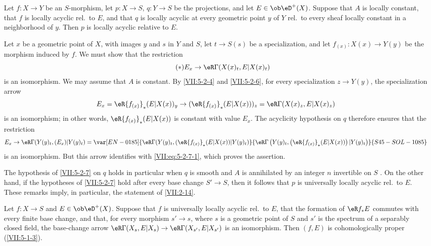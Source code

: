 \begin{corollary}\label{VII:5-2-7}
Let $f:X\to Y$ be an $S$-morphism, let $p:X\to S$, $q:Y\to S$ be the
projections, and let $E\in\ob\eD^+(X)$. Suppose that $A$ is locally constant,
that $f$ is locally acyclic rel.\ to $E$, and that $q$ is locally acyclic at
every geometric point $y$ of $Y$ rel.\ to every sheaf locally constant
in a neighborhood of $y$. Then $p$ is locally acyclic relative to $E$.
\end{corollary}

Let $x$ be a geometric point of $X$, with images $y$ and $s$ in $Y$ and $S$,
let $t\to S(s)$ be a specialization, and let
$f_{(x)}:X(x)\to Y(y)$ be the morphism induced by $f$. We must show that the
restriction
\begin{equation*}\tag{$*$}\label{VII:eq:5-2-7-1}
  E_x \to \eR\Gamma(X(x)_t,E|X(x)_t) 
\end{equation*}
is an isomorphism. We may assume that $A$ is constant. By \ref{VII:5-2-4} and
\ref{VII:5-2-6}, for every specialization $z\to Y(y)$, the specialization
arrow
\[
  E_x = \eR {f_{(x)}}_\ast (E|X(x))_y \to (\eR {f_{(x)}}_\ast (E|X(x)))_z = \eR\Gamma(X(x)_z,E|X(x)_z) 
\]
is an isomorphism; in other words, $\eR{f_{(x)}}_\ast(E|X(x))$ is constant
with value $E_x$. The acyclicity hypothesis on $q$ therefore ensures that the restriction
\[
  E_x \to \eR\Gamma(Y(y)_t,(E_x)|Y(y)_t) = \var[EN-0185]{\eR\Gamma(Y(y)_t,(\eR {f_{(x)}}_\ast (E|X(x))|Y(y)_t)}{\eR\Gamma\left(Y(y)_t,\left(\eR {f_{(x)}}_\ast (E|X(x))\right)|Y(y)_t\right)}{S45-SOL-1085}
\]
is an isomorphism. But this arrow identifies with
\eqref{VII:eq:5-2-7-1}, which proves the assertion.

The hypothesis of \ref{VII:5-2-7} on $q$ holds in particular when $q$ is
smooth and $A$ is annihilated by an integer $n$ invertible on $S$
. On the other hand, if the hypotheses of \ref{VII:5-2-7} hold
after every base change $S'\to S$, then it follows that $p$ is universally
locally acyclic rel.\ to $E$. These remarks imply, in particular, the
statement of \ref{VII:2-14}.






\begin{corollary}\label{VII:5-2-8}
Let $f:X\to S$ and $E\in \ob\eD^+(X)$. Suppose that $f$ is universally locally
acyclic rel.\ to $E$, that the formation of $\eR f_\ast E$ commutes with
every finite base change, and that, for every morphism $s'\to s$, where $s$ is
a geometric point of $S$ and $s'$ is the spectrum of a separably closed
field, the base-change arrow
$\eR\Gamma(X_s,E|X_s)\to \eR\Gamma(X_{s'},E|X_{s'})$ is an isomorphism. Then
$(f,E)$ is cohomologically proper (\ref{VII:5-1-3}).
\end{corollary}

